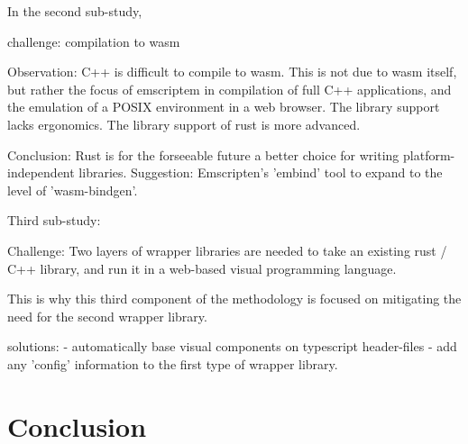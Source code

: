 In the second sub-study,

challenge: 
compilation to wasm

Observation: 
C++ is difficult to compile to wasm.
This is not due to wasm itself, but rather the focus of emscriptem in compilation of full C++ applications, and the emulation of a POSIX environment in a web browser. 
The library support lacks ergonomics.
The library support of rust is more advanced.

Conclusion: 
Rust is for the forseeable future a better choice for writing platform-independent libraries. 
Suggestion: Emscripten's 'embind' tool to expand to the level of 'wasm-bindgen'.

Third sub-study: 

Challenge:
Two layers of wrapper libraries are needed to take an existing rust / C++ library, and run it in a web-based visual programming language.

This is why this third component of the methodology is focused on mitigating the need for the second wrapper library. 

solutions: 
- automatically base visual components on typescript header-files
- add any 'config' information to the first type of wrapper library. 

\section{Conclusion}

